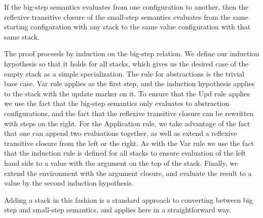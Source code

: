 \begin{lemma}
If the big-step semantics evaluates from one configuration to another, then the
reflexive transitive closure of the small-step semantics evaluates from the same
starting configuration with any stack to the same value configuration with that
same stack.
\end{lemma}
\begin{proofoutline}
The proof proceeds by induction on the big-step relation. We define our
induction hypothesis so that it holds for all stacks, which gives us the
desired case of the empty stack as a simple specialization. The rule for
abstractions is the trivial base case. Var rule applies as the first step, and
the induction hypothesis applies to the stack with the update marker on it. To
ensure that the Upd rule applies we use the fact that the big-step semantics
only evaluates to abstraction configurations, and the fact that the reflexive
transitive closure can be rewritten with steps on the right. For the Application
rule, we take advantage of the fact that one can append two evaluations together,
as well as extend a reflexive transitive closure from the left or the right. As
with the Var rule we use the fact that the induction rule is defined for all
stacks to ensure evaluation of the left hand side to a value with the argument
on the top of the stack. Finally, we extend the environment with the argument
closure, and evaluate the result to a value by the second induction hypothesis.
\end{proofoutline}

Adding a stack in this fashion is a standard approach to converting between big
step and small-step semantics, and applies here in a straightforward way. 
